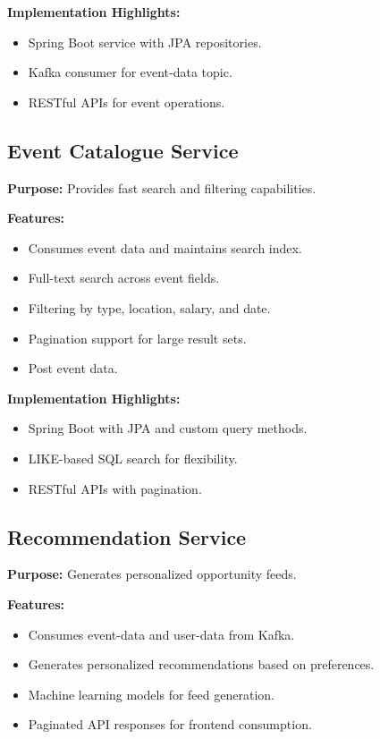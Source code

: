 \documentclass[12pt,a4paper]{report}
\begin{document}
\textbf{Implementation Highlights:}
\begin{itemize}
    \item Spring Boot service with JPA repositories.
    \item Kafka consumer for event-data topic.
    \item RESTful APIs for event operations.
\end{itemize}

\subsection{Event Catalogue Service}

\textbf{Purpose:} Provides fast search and filtering capabilities.

\textbf{Features:}
\begin{itemize}
    \item Consumes event data and maintains search index.
    \item Full-text search across event fields.
    \item Filtering by type, location, salary, and date.
    \item Pagination support for large result sets.
    \item Post event data.
\end{itemize}

\textbf{Implementation Highlights:}
\begin{itemize}
    \item Spring Boot with JPA and custom query methods.
    \item LIKE-based SQL search for flexibility.
    \item RESTful APIs with pagination.
\end{itemize}

\subsection{Recommendation Service}

\textbf{Purpose:} Generates personalized opportunity feeds.

\textbf{Features:}
\begin{itemize}
    \item Consumes event-data and user-data from Kafka.
    \item Generates personalized recommendations based on preferences.
    \item Machine learning models for feed generation.
    \item Paginated API responses for frontend consumption.
\end{itemize}
\end{document}
